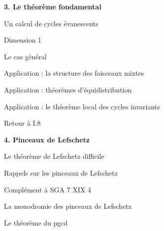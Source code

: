 \documentclass[11pt,leqno]{article}
\begin{document}
\medskip
\noindent\textbf{3. Le théorème fondamental}\dotfill{}\par
\noindent\hspace*{1em}Un calcul de cycles évanescents\dotfill{}\par
\noindent\hspace*{1em}Dimension 1\dotfill{}\par
\noindent\hspace*{1em}Le cas général\dotfill{}\par
\noindent\hspace*{1em}Application : la structure des faisceaux mixtes\dotfill{}\par
\noindent\hspace*{1em}Application : théorèmes d’équidistribution\dotfill{}\par
\noindent\hspace*{1em}Application : le théorème local des cycles invariants\dotfill{}\par
\noindent\hspace*{1em}Retour à I.8\dotfill{}\par
\medskip
\noindent\textbf{4. Pinceaux de Lefschetz}\dotfill{}\par
\noindent\hspace*{1em}Le théorème de Lefschetz difficile\dotfill{}\par
\noindent\hspace*{1em}Rappels sur les pinceaux de Lefschetz\dotfill{}\par
\noindent\hspace*{1em}Complément à SGA 7 XIX 4\dotfill{}\par
\noindent\hspace*{1em}La monodromie des pinceaux de Lefschetz\dotfill{}\par
\noindent\hspace*{1em}Le théorème du pgcd\dotfill{}\par
\endgroup
\end{document}
